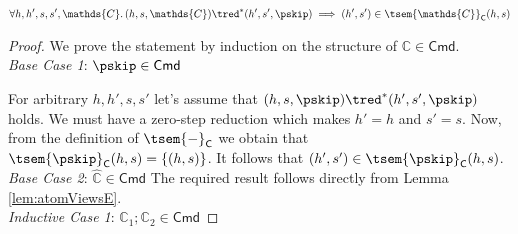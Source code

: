 \begin{lem}
	\label{lem:atomViewsC}
	\begin{gather*}
		\forall h, h', s, s', \mathds{C} \ldotp
		(h, s, \mathds{C}) \tred^* (h', s', \pskip)
		\implies
		(h', s') \in \tsem{\mathds{C}}_\mathsf{C}(h, s)
	\end{gather*}
	{\parindent0pt
	\begin{proof}
	We prove the statement by induction on the structure of $\mathds{C} \in \mathsf{Cmd}$. \\
	
	\textit{Base Case 1}: $\pskip \in \mathsf{Cmd}$
	
	For arbitrary $h, h', s, s'$ let's assume that $(h, s, \pskip) \tred^* (h', s', \pskip)$ holds. We must have a zero-step reduction which makes $h' = h$ and $s' = s$. Now, from the definition of $\tsem{-}_\mathsf{C}$ we obtain that $\tsem{\pskip}_\mathsf{C}(h, s) = \{(h,s)\}$. It follows that $(h', s') \in \tsem{\pskip}_\mathsf{C}(h, s)$. \\
	
	\textit{Base Case 2}: $\hat{\mathds{C}} \in \mathsf{Cmd}$
	The required result follows directly from Lemma \ref{lem:atomViewsE}. \\
	
	\textit{Inductive Case 1}: $\mathds{C}_1 ; \mathds{C}_2 \in \mathsf{Cmd}$
	

\end{proof}}
\end{lem}
